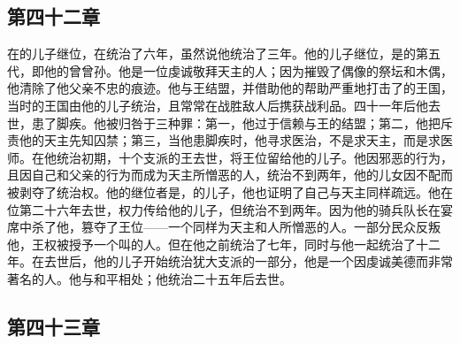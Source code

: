 
\subsection{第四十二章}

在的儿子继位，在统治了六年，虽然说他统治了三年。他的儿子继位，是的第五代，即他的曾曾孙。他是一位虔诚敬拜天主的人；因为摧毁了偶像的祭坛和木偶，他清除了他父亲不忠的痕迹。他与王结盟，并借助他的帮助严重地打击了的王国，当时的王国由他的儿子统治，且常常在战胜敌人后携获战利品。四十一年后他去世，患了脚疾。他被归咎于三种罪：第一，他过于信赖与王的结盟；第二，他把斥责他的天主先知囚禁；第三，当他患脚疾时，他寻求医治，不是求天主，而是求医师。在他统治初期，十个支派的王去世，将王位留给他的儿子。他因邪恶的行为，且因自己和父亲的行为而成为天主所憎恶的人，统治不到两年，他的儿女因不配而被剥夺了统治权。他的继位者是，的儿子，他也证明了自己与天主同样疏远。他在位第二十六年去世，权力传给他的儿子，但统治不到两年。因为他的骑兵队长在宴席中杀了他，篡夺了王位——一个同样为天主和人所憎恶的人。一部分民众反叛他，王权被授予一个叫的人。但在他之前统治了七年，同时与他一起统治了十二年。在去世后，他的儿子开始统治犹大支派的一部分，他是一个因虔诚美德而非常著名的人。他与和平相处；他统治二十五年后去世。\par


\subsection{第四十三章}

